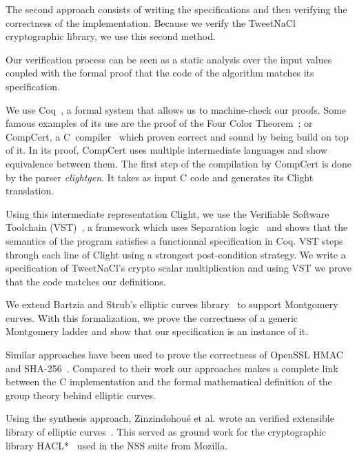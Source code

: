 The second approach consists of writing the specifications and then verifying
the correctness of the implementation.
Because we verify the TweetNaCl cryptographic library, we use this second method.


Our verification process can be seen as a static analysis over the input values
coupled with the formal proof that the code of the algorithm matches its specification.

We use Coq~\cite{coq-faq}, a formal system that allows us to machine-check our proofs.
Some famous examples of its use are the proof of the Four Color Theorem~\cite{gonthier2008formal}; or
CompCert, a C~compiler~\cite{Leroy-backend} which proven correct and sound by being build on top of it.
In its proof, CompCert uses multiple intermediate languages and show equivalence between them.
The first step of the compilation by CompCert is done by the parser \textit{clightgen}.
It takes as input C code and generates its Clight~\cite{Blazy-Leroy-Clight-09} translation.

Using this intermediate representation Clight, we use the Verifiable Software Toolchain
(VST)~\cite{2012-Appel}, a framework which uses Separation logic~\cite{1969-Hoare,Reynolds02separationlogic}
and shows that the semantics of the program satisfies a functionnal specification in Coq.
VST steps through each line of Clight using a strongest post-condition strategy.
We write a specification of TweetNaCl's crypto scalar multiplication and using
VST we prove that the code matches our definitions.

We extend Bartzia and Strub's elliptic curves library~\cite{DBLP:conf/itp/BartziaS14}
to support Montgomery curves. With this formalization, we prove the correctness
of a generic Montgomery ladder and show that our specification is an instance of it.



Similar approaches have been used to prove the correctness of OpenSSL
HMAC~\cite{Beringer2015VerifiedCA} and SHA-256~\cite{2015-Appel}. Compared to
their work our approaches makes a complete link between the C implementation and
the formal mathematical definition of the group theory behind elliptic curves.

Using the synthesis approach, Zinzindohou{\'{e}} et al. wrote an verified extensible
library of elliptic curves~\cite{Zinzindohoue2016AVE}. This served as ground work for the
cryptographic library HACL*~\cite{zinzindohoue2017hacl} used in the NSS suite from Mozilla.


